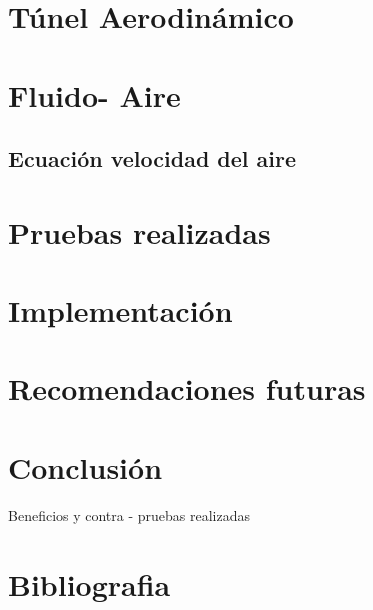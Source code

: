 \documentclass[12pt,a4paper]{article}
\begin{document}
	\section{Túnel Aerodinámico}
		
	
\newpage
	\section{Fluido- Aire}
	\subsection{Ecuación velocidad del aire} \label{sec:ecvel}
	
	\newpage
	
	\newpage
	\section{Pruebas realizadas}
	
	\newpage
	\section{Implementación} 
	
		\newpage
	\section{Recomendaciones futuras}
	
	\newpage
	\section{Conclusión}
	
	
	Beneficios y  contra - pruebas realizadas
		\newpage
	\section{Bibliografia}


\printbibliography

\newpage

\appendix
\clearpage
\appendixpage


\end{document}
